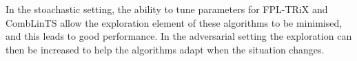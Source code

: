 In the stoachastic setting, the ability to tune parameters for FPL-TRiX and CombLinTS allow the exploration element of these algorithms to be minimised, and this leads to good performance. In the adversarial setting the exploration can then be increased to help the algorithms adapt when the situation changes.\\







%
%


\newpage




